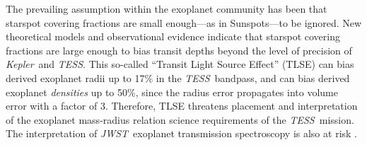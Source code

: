 \documentclass[twocolumn]{aastex631}
\newcommand{\tess}{{\it TESS}}
\newcommand{\jwst}{{\it JWST}}
\newcommand{\kepler}{{\it Kepler}}
\begin{document}
The prevailing assumption within the exoplanet community has been that starspot covering fractions are small enough---as in Sunspots---to be ignored.  New theoretical models \citep{2018ApJ...853..122R} and observational evidence \citep{2016MNRAS.463.2494F} indicate that starspot covering fractions are large enough to bias transit depths beyond the level of precision of \kepler\ and \tess.  This so-called ``Transit Light Source Effect'' (TLSE) can bias derived exoplanet radii up to 17\% in the \tess\ bandpass, and can bias derived exoplanet \emph{densities} up to 50\%, since the radius error propagates into volume error with a factor of 3.  Therefore, TLSE threatens placement and interpretation of the exoplanet mass-radius relation science requirements of the \tess\ mission.  The interpretation of \jwst\ exoplanet transmission spectroscopy is also at risk \citep{2019AJ....157...11W}.
\end{document}

